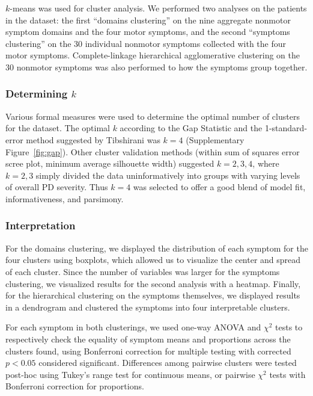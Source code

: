 \documentclass[preprint,5p]{elsarticle} %
\begin{document}
$k$-means was used for cluster analysis. We performed two analyses on the
patients in the dataset: the first ``domains clustering'' on the nine aggregate nonmotor symptom
domains and the four motor symptoms, and the second ``symptoms clustering'' on the 30 individual
nonmotor symptoms collected with the four motor symptoms. Complete-linkage
hierarchical agglomerative clustering on the 30 nonmotor symptoms was also performed to how the symptoms group
together.

\subsubsection{Determining $k$}

Various formal measures were used to determine the optimal number of clusters for the dataset. The
optimal $k$ according to the Gap Statistic and the 1-standard-error method suggested by
Tibshirani\cite{tibshirani01gap} was $k = 4$ (Supplementary Figure~\ref{fig:gap}). Other cluster validation
methods (within sum of squares error scree plot, minimum average silhouette width) suggested $k =
2, 3, 4$, where $k = 2, 3$ simply divided the data uninformatively into groups with varying levels
of overall PD severity. Thus $k = 4$ was selected to offer a good blend of model fit,
informativeness, and parsimony.

\subsubsection{Interpretation}

For the domains clustering, we displayed the distribution of each symptom for the four
clusters using boxplots, which allowed us to visualize the center and spread of each cluster. Since
the number of variables was larger for the symptoms clustering, we visualized results for the
second analysis with a heatmap. Finally, for the hierarchical clustering on the symptoms
themselves, we displayed results in a dendrogram and clustered the symptoms into four interpretable
clusters.

For each symptom in both clusterings, we used one-way ANOVA and $\chi^2$ tests to respectively
check the equality of symptom means and proportions across the clusters found, using Bonferroni
correction for multiple testing with corrected $p < 0.05$ considered significant. Differences among
pairwise clusters were tested post-hoc using Tukey's range test for continuous means, or pairwise
$\chi^2$ tests with Bonferroni correction for proportions.
\end{document}
